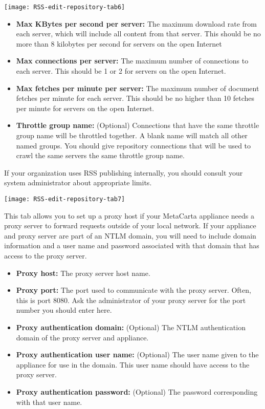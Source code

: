 \texttt{[image: RSS-edit-repository-tab6]}

\begin{itemize}


\item \textbf{Max KBytes per second per server:} The maximum download rate
from each server, which will include all content from that server. This
should be no more than 8 kilobytes per second for servers on the open
Internet

\item \textbf{Max connections per server:} The maximum number of
connections to each server. This should be 1 or 2 for servers on the
open Internet.

\item \textbf{Max fetches per minute per server:} The maximum number of
document fetches per minute for each server. This should be no higher
than 10 fetches per minute for servers on the open Internet.

\item \textbf{Throttle group name:} (Optional) Connections that have the
same throttle group name will be throttled together. A blank name will
match all other named groups. You should give repository connections
that will be used to crawl the same servers the same throttle group name.

\end{itemize}

If your organization uses RSS publishing internally, you should
consult your system administrator about appropriate limits.

\texttt{[image: RSS-edit-repository-tab7]}

This tab allows you to set up a proxy host if your MetaCarta appliance
needs a proxy server to forward requests outside of your
local network. If your appliance and proxy server are part of an NTLM
domain, you will need to include domain information and a user name
and password associated with that domain that has access to the proxy
server.

\begin{itemize}

\item \textbf{Proxy host:} The proxy server host name.

\item \textbf{Proxy port:} The port used to communicate with the proxy server. Often, this is port 8080. Ask the administrator of your proxy server for the port number you should enter here.

\item \textbf{Proxy authentication domain:} (Optional) The NTLM authentication domain of the proxy server and appliance.

\item \textbf{Proxy authentication user name:} (Optional) The user name given to the appliance for use in the domain. This user name should have access to the proxy server.

\item \textbf{Proxy authentication password:} (Optional) The password corresponding with that user name.

\end{itemize}


